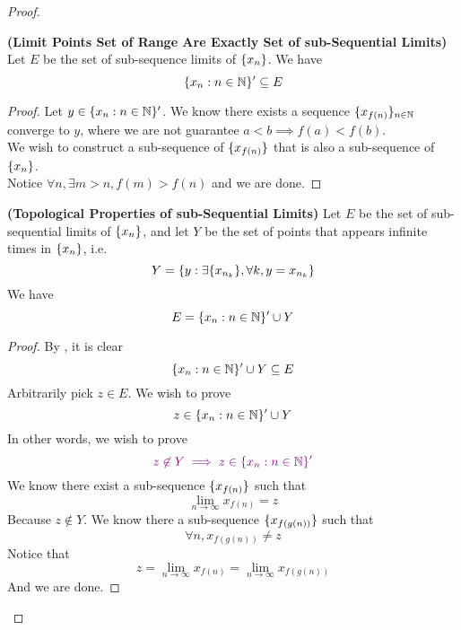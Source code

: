 \documentclass{report}
\begin{document}
\begin{proof}
{\begin{minipage}{39em}
\end{minipage}}
\begin{theorem}
\label{4.3.6}
\textbf{(Limit Points Set of Range Are Exactly Set of sub-Sequential Limits)} Let $E$ be the set of sub-sequence limits of  $\{ x_n \}$. We have
\begin{equation}
\{ x_n:n\in\mathbb{N} \}'\subseteq E
\end{equation}
\end{theorem}
\begin{proof}
Let $y\in \{ x_n:n\in\mathbb{N} \}'$. We know there exists a sequence $\{ x_{f(n)} \}_{n\in\mathbb{N}}$ converge to $y$, where we are not guarantee $a<b\implies f(a)<f(b)$.\\

We wish to construct a sub-sequence of $\{ x_{f(n)} \}$ that is also a sub-sequence of $\{ x_n \}$.\\

Notice  $\forall n, \exists m>n, f(m)>f(n)$ and we are done.
\end{proof}
\begin{theorem}
\label{4.3.7}
\textbf{(Topological Properties of sub-Sequential Limits)} Let $E$ be the set of sub-sequential limits of $\{ x_n \}$, and let $Y$ be the set of points that appears infinite times in  $\{ x_n \}$, i.e.
\begin{equation}
  Y=\{ y:\exists \{ x_{n_k} \},\forall k, y=x_{n_k} \}
\end{equation}
We have
\begin{equation}
E=\{ x_n:n\in\mathbb{N} \}' \cup Y
\end{equation}
\end{theorem}
\begin{proof}
By , it is clear 
\begin{equation}
\{ x_n:n\in\mathbb{N} \}' \cup Y\subseteq E
\end{equation}
Arbitrarily pick $z\in E$. We wish to prove
\begin{equation}
z\in \{ x_n:n\in\mathbb{N} \}'\cup Y
\end{equation}
In other words, we wish to prove
\begin{equation}
  \textcolor{violet}{z\not\in Y\implies z\in \{ x_n:n\in\mathbb{N} \}'}
\end{equation}
We know there exist a sub-sequence $\{ x_{f(n)} \}$ such that 
\begin{equation}
\lim_{n\to\infty}x_{f(n)}=z
\end{equation}
Because $z\not\in Y$. We know there a sub-sequence $\{ x_{f(g(n))} \}$ such that
\begin{equation}
\forall n,x_{f(g(n))}\neq z
\end{equation}
Notice that
 \begin{equation}
z=\lim_{n\to\infty}x_{f(n)}=\lim_{n\to\infty}x_{f(g(n))} 
\end{equation}
And we are done.
\end{proof}
\fbox{\begin{minipage}{39em}


\end{minipage}}
\end{proof}
\end{document}
